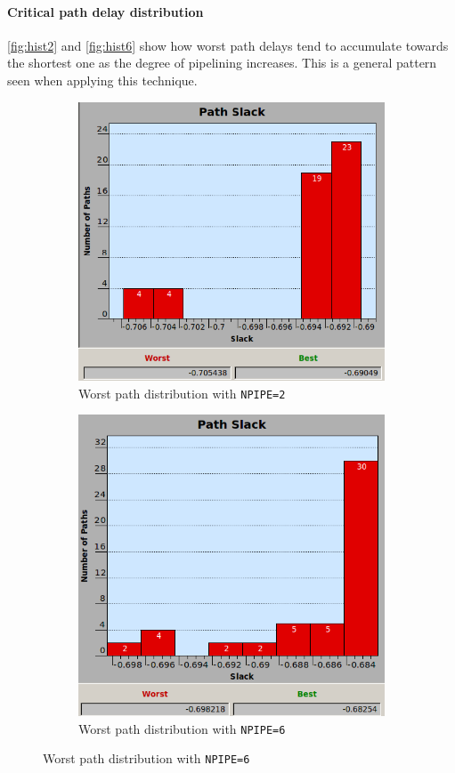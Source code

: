 \paragraph{Critical path delay distribution}
\autoref{fig:hist2} and \autoref{fig:hist6} show how worst path delays tend to accumulate towards the shortest one as the degree of pipelining increases. This is a general pattern seen when applying this technique.
\begin{figure}[htbp]
	\begin{subfigure}{0.5\textwidth}
		\centering
	\includegraphics[width=\textwidth]{chapter1/images/npipe2.png}
	\caption{Worst path distribution with \texttt{NPIPE=2}}
	\label{fig:hist2}
\end{subfigure}
\begin{subfigure}{0.5\textwidth}
	\centering
	\includegraphics[width=\textwidth]{chapter1/images/npipe6.png}
	\caption{Worst path distribution with \texttt{NPIPE=6}}
	\label{fig:hist6}
	\end{subfigure}
\end{figure}
